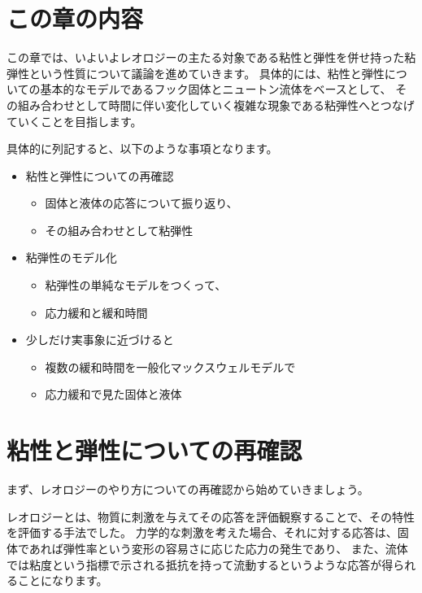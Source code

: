\documentclass[uplatex,dvipdfmx,a4paper,11pt]{jsarticle}
\begin{document}
\section*{この章の内容}

この章では、いよいよレオロジーの主たる対象である粘性と弾性を併せ持った粘弾性という性質について議論を進めていきます。
具体的には、粘性と弾性についての基本的なモデルであるフック固体とニュートン流体をベースとして、
その組み合わせとして時間に伴い変化していく複雑な現象である粘弾性へとつなげていくことを⽬指します。

具体的に列記すると、以下のような事項となります。
\begin{boxnote}
    \begin{itemize}
        \item 粘性と弾性についての再確認
            \begin{itemize}
                \item 固体と液体の応答について振り返り、
                \item その組み合わせとして粘弾性
            \end{itemize} 
        \item 粘弾性のモデル化
            \begin{itemize}
                \item 粘弾性の単純なモデルをつくって、
                \item 応力緩和と緩和時間
            \end{itemize} 
        \item 少しだけ実事象に近づけると
            \begin{itemize}
                \item 複数の緩和時間を一般化マックスウェルモデルで
                \item 応力緩和で見た固体と液体
            \end{itemize}
    \end{itemize}
\end{boxnote}


\section{粘性と弾性についての再確認}
まず、レオロジーのやり方についての再確認から始めていきましょう。

レオロジーとは、物質に刺激を与えてその応答を評価観察することで、その特性を評価する手法でした。
力学的な刺激を考えた場合、それに対する応答は、固体であれば弾性率という変形の容易さに応じた応力の発生であり、
また、流体では粘度という指標で示される抵抗を持って流動するというような応答が得られることになります。
\end{document}
